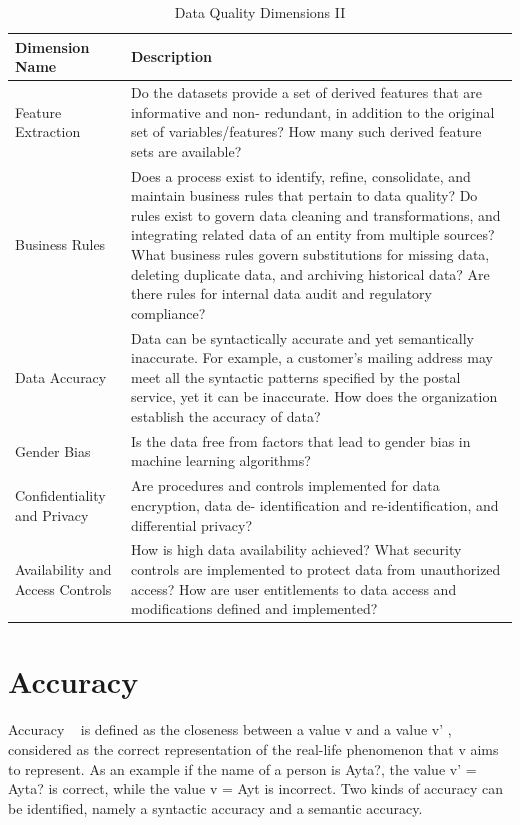 \begin{table}
\caption{Data Quality Dimensions II}
\centering
\begin{tabular}{p{4.0cm} p{10cm}}
\toprule
\textbf{Dimension Name} & \textbf{Description} \\ 
\bottomrule
Feature Extraction & 
Do the datasets provide a set of derived features that are informative and non-
redundant, in addition to the original set of variables/features? How many such
derived feature sets are available? 
\\
Business Rules & 
Does a process exist to identify, refine, consolidate, and maintain business
rules that pertain to data quality? Do rules exist to govern data cleaning and
transformations, and integrating related data of an entity from multiple sources?
What business rules govern substitutions for missing data, deleting duplicate data,
and archiving historical data? Are there rules for internal data audit and regulatory
compliance? \\
Data Accuracy & 
Data can be syntactically accurate and yet semantically inaccurate. For example,
a customer's mailing address may meet all the syntactic patterns specified by the
postal service, yet it can be inaccurate. How does the organization establish the
accuracy of data? \\
Gender Bias & 
Is the data free from factors that lead to gender bias in machine learning
algorithms? \\
Confidentiality and Privacy & 
Are procedures and controls implemented for data encryption, data de-
identification and re-identification, and differential privacy? \\
Availability and Access Controls & 
How is high data availability achieved? What security controls are implemented to
protect data from unauthorized access? How are user entitlements to data access
and modifications defined and implemented? \\
\bottomrule
\end{tabular}
\end{table}


\section{Accuracy}

Accuracy ~\citep{Falorsi} is defined as the closeness between a value v and a value v' , considered as 
the correct representation of the real-life phenomenon that v aims to
represent. As an example if the name of a person is Ayta?, the value v' = Ayta?
is correct, while the value v = Ayt is incorrect. Two kinds of accuracy can be
identified, namely a syntactic accuracy and a semantic accuracy.

